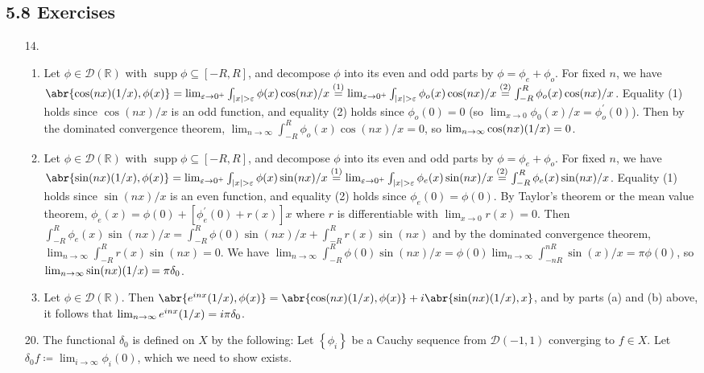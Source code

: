 \documentclass[11pt,leqno]{article}
\theoremstyle{plain}
\theoremstyle{definition}
\numberwithin{equation}{section}
\numberwithin{lem}{section}
\newcommand{\cbr}[1]{\left\{#1\right\}}
\newcommand{\eq}[1]{\overset{(#1)}{=}}
\DeclareMathOperator{\supp}{supp}
\let\PV\relax
\DeclareMathOperator{\PV}{PV}
\begin{document}
\subsection*{5.8 Exercises}
\begin{enumerate}
    \item[14.] \begin{enumerate}
      \item Let $\phi\in \mathcal D(\mathbb R)$ with $\supp \phi\subseteq [-R,R]$, and decompose $\phi$ into its even and odd parts by $\phi = \phi_e + \phi_o$.
      For fixed $n$, we have $\abr{\cos(nx)\PV(1/x), \phi(x)}= \lim_{\varepsilon\to 0^+}\int_{\abs{x}>\varepsilon}\phi(x)\cos(nx)/x \eq{1} \lim_{\varepsilon\to 0^+}\int_{\abs{x}>\varepsilon}\phi_o(x)\allowbreak\cos(nx)/x \eq{2}\int_{-R}^{R}\phi_o(x)\cos(nx)/x$.
      Equality (1) holds since $\cos(nx)/x$ is an odd function, and equality (2) holds since $\phi_o(0) = 0$ (so $\lim_{x\to 0}\phi_0(x)/x = \phi_o^\prime(0)$). Then by the dominated convergence theorem, $\lim_{n\to\infty}\int_{-R}^{R}\phi_o(x)\cos(nx)/x = 0$, so $\lim_{n\to\infty}\cos(nx)\PV(1/x)= 0$.
      \item Let $\phi\in \mathcal D(\mathbb R)$ with $\supp \phi\subseteq [-R,R]$, and decompose $\phi$ into its even and odd parts by $\phi = \phi_e + \phi_o$.
      For fixed $n$, we have $\abr{\sin(nx)\PV(1/x), \phi(x)}= \lim_{\varepsilon\to 0^+}\int_{\abs{x}>\varepsilon}\phi(x)\sin(nx)/x\eq{1} \lim_{\varepsilon\to 0^+}\int_{\abs{x}>\varepsilon}\phi_e(x)\allowbreak\sin(nx)/x\eq{2} \int_{-R}^{R}\phi_e(x)\sin(nx)/x$. Equality (1) holds since $\sin(nx)/x$ is an even function, and equality (2) holds since $\phi_e(0) = \phi(0)$. By Taylor's theorem or the mean value theorem, $\phi_e(x) = \phi(0) + [\phi_e^\prime(0)+r(x)]x$ where $r$ is differentiable with $\lim_{x\to 0}r(x) = 0$. Then $\int_{-R}^{R}\phi_e(x)\sin(nx)/x = \int_{-R}^{R}\phi(0)\sin(nx)/x + \int_{-R}^{R}r(x)\sin(nx)$ and by the dominated convergence theorem, $\lim_{n\to\infty}\int_{-R}^{R}r(x)\sin(nx) = 0$. We have $\lim_{n\to\infty}\int_{-R}^{R}\phi(0)\sin(nx)/x = \phi(0)\lim_{n\to\infty}\int_{-nR}^{nR}\sin(x)/x = \pi\phi(0)$, so $\lim_{n\to\infty}\sin(nx)\PV(1/x)= \pi\delta_0$.
      \item Let $\phi\in \mathcal D(\mathbb R)$. Then $\abr{e^{inx}\PV(1/x),\phi(x)} = \abr{\cos(nx)\PV(1/x),\phi(x)} + i\abr{\sin(nx)\PV(1/x),x}$, and by parts (a) and (b) above, it follows that $\lim_{n\to\infty}e^{inx}\PV(1/x) = i\pi\delta_0$.
    \end{enumerate}
    \item[20.] The functional $\delta_0$ is defined on $X$ by the following: Let $\cbr{\phi_i}$ be a Cauchy sequence from $\mathcal D(-1,1)$ converging to $f\in X$. Let $\delta_0f \coloneqq \lim_{i\to\infty}\phi_i(0)$, which we need to show exists. 
    

\end{enumerate}
\end{document}
